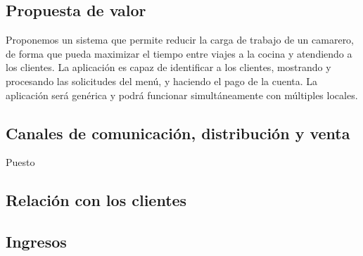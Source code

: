 \subsection{Propuesta de valor}


Proponemos un sistema que permite reducir la carga de trabajo de un camarero, de forma que pueda maximizar el tiempo entre viajes a la cocina y atendiendo a los clientes. La aplicación es capaz de identificar a los clientes, mostrando y procesando las solicitudes del menú, y haciendo el pago de la cuenta.
La aplicación será genérica y podrá funcionar simultáneamente con múltiples locales.



\subsection{Canales de comunicación, distribución y venta}


Puesto 



\subsection{Relación con los clientes}


\subsection{Ingresos}

